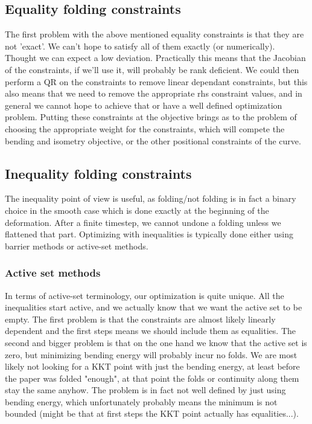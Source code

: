 \documentclass{article}
\theoremstyle{definition}
\begin{document}
\subsection{Equality folding constraints}
The first problem with the above mentioned equality constraints is that they are not 'exact'. We can't hope to satisfy all of them exactly (or numerically). Thought we can expect a low deviation. Practically this means that the Jacobian of the constraints, if we'll use it, will probably be rank deficient. We could then perform a QR on the constraints to remove linear dependant constraints, but this also means that we need to remove the appropriate rhs constraint values, and in general we cannot hope to achieve that or have a well defined optimization problem. Putting these constraints at the objective brings as to the problem of choosing the appropriate weight for the constraints, which will compete the bending and isometry objective, or the other positional constraints of the curve.

\subsection{Inequality folding constraints}
The inequality point of view is useful, as folding/not folding is in fact a binary choice in the smooth case which is done exactly at the beginning of the deformation. After a finite timestep, we cannot undone a folding unless we flattened that part. Optimizing with inequalities is typically done either using barrier methods or active-set methods. 
\subsubsection{Active set methods}
In terms of active-set terminology, our optimization is quite unique. All the inequalities start active, and we actually know that we want the active set to be empty. The first problem is that the constraints are almost likely linearly dependent and the first steps means we should include them as equalities. The second and bigger problem is that on the one hand we know that the active set is zero, but minimizing bending energy will probably incur no folds. We are most likely not looking for a KKT point with just the bending energy, at least before the paper was folded "enough", at that point the folds or continuity along them stay the same anyhow. The problem is in fact not well defined by just using bending energy, which unfortunately probably means the minimum is not bounded (might be that at first steps the KKT point actually has equalities...).
\end{document}

